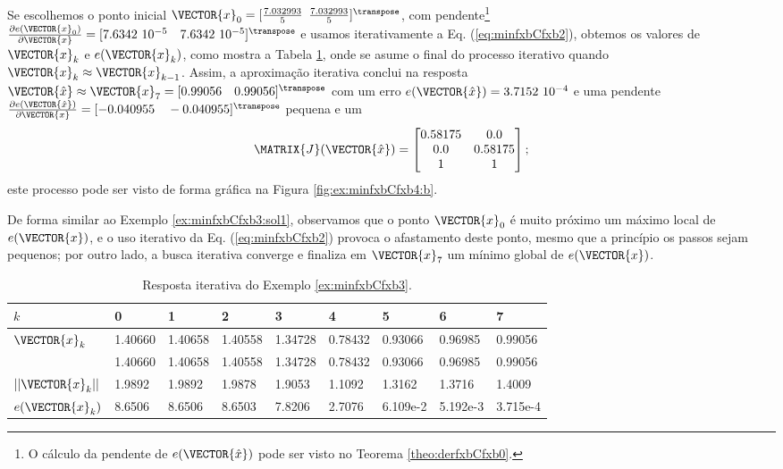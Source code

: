 \begin{SolutionT}
\label{ex:minfxbCfxb3:sol2}
Se escolhemos o ponto inicial $\VECTOR{x}_0=[\frac{7.032993}{5}$ $\frac{7.032993}{5}]^{\transpose}$,
com pendente\footnote{O cálculo da
pendente de $e(\VECTOR{\hat{x}})$ pode ser visto no Teorema \ref{theo:derfxbCfxb0}.} 
$\frac{\partial e(\VECTOR{x}_0)}{\partial \VECTOR{x} }=[7.6342~10^{-5}\quad 7.6342~10^{-5}]^{\transpose}$ e 
usamos iterativamente a Eq. (\ref{eq:minfxbCfxb2}), obtemos os valores 
de $\VECTOR{x}_k$ e $e(\VECTOR{x}_k)$, como mostra a Tabela \ref{table:ex:minfxbCfxb4},
onde se asume o final do processo iterativo quando $\VECTOR{x}_k \approx \VECTOR{x}_{k-1}$.
Assim, a aproximação iterativa conclui na resposta $\VECTOR{\hat{x}}\approx \VECTOR{x}_{7} =[0.99056\quad 0.99056]^{\transpose}$
com um erro $e(\VECTOR{\hat{x}})=3.7152~10^{-4}$ e uma pendente
$\frac{\partial e(\VECTOR{\hat{x}})}{\partial \VECTOR{x} }=[-0.040955\quad -0.040955]^{\transpose}$
pequena e um
\begin{equation}
\MATRIX{J}(\VECTOR{\hat{x}})=
\begin{bmatrix}
0.58175 & 0.0\\ 
0.0     & 0.58175\\
1       & 1
\end{bmatrix};
\end{equation}
este processo pode ser visto de forma gráfica na Figura \ref{fig:ex:minfxbCfxb4:b}.

De forma similar ao Exemplo \ref{ex:minfxbCfxb3:sol1}, observamos 
que o ponto $\VECTOR{x}_0$ é muito próximo um máximo local de 
$e(\VECTOR{x})$, e o uso iterativo da Eq. (\ref{eq:minfxbCfxb2}) 
provoca o afastamento deste ponto, mesmo que a princípio os passos sejam pequenos;
por outro lado, a busca iterativa converge e finaliza em $\VECTOR{x}_7$ um mínimo global
de $e(\VECTOR{x})$.
\end{SolutionT}


\begin{table}[h!]
\centering
\begin{tabular}{|l|l|l|l|l|l|l|l|l|}
\hline
$k$ & 0 & 1 & 2 & 3 & 4 & 5 & 6 & 7\\ \hline
$\VECTOR{x}_k$ & 1.40660   & 1.40658   & 1.40558   & 1.34728   & 0.78432   & 0.93066   & 0.96985   & 0.99056 \\ 
~              & 1.40660   & 1.40658   & 1.40558   & 1.34728   & 0.78432   & 0.93066   & 0.96985   & 0.99056 \\ \hline
$||\VECTOR{x}_k||$ & 1.9892   & 1.9892   & 1.9878   & 1.9053   & 1.1092   & 1.3162   & 1.3716   & 1.4009 \\ \hline
$e(\VECTOR{x}_k)$ & 8.6506  & 8.6506  & 8.6503  & 7.8206  & 2.7076  & 6.109e-2 &  5.192e-3  & 3.715e-4 \\ \hline
\end{tabular}
\caption{Resposta iterativa do Exemplo \ref{ex:minfxbCfxb3}.}
\label{table:ex:minfxbCfxb4}
\end{table}

